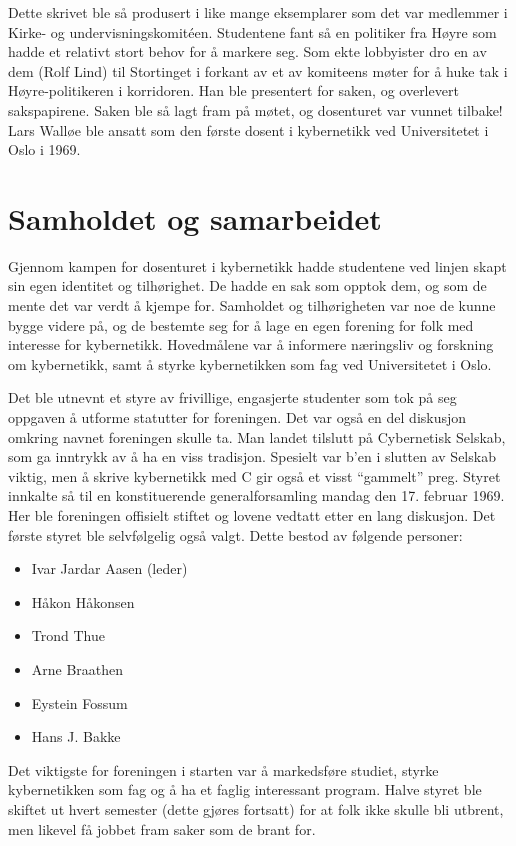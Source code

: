 \documentclass[../../main.tex]{subfiles}
\begin{document}
Dette skrivet ble så produsert i like mange eksemplarer som det var medlemmer i Kirke- og undervisningskomitéen. Studentene fant så en politiker fra Høyre som hadde et relativt stort behov for å markere seg. Som ekte lobbyister dro en av dem (Rolf Lind) til Stortinget i forkant av et av komiteens møter for å huke tak i Høyre-politikeren i korridoren. Han ble presentert for saken, og overlevert sakspapirene. Saken ble så lagt fram på møtet, og dosenturet var vunnet tilbake!
Lars Walløe ble ansatt som den første dosent i kybernetikk ved Universitetet i Oslo i 1969.

\section{Samholdet og samarbeidet}

Gjennom kampen for dosenturet i kybernetikk hadde studentene ved linjen skapt sin egen identitet og tilhørighet. De hadde en sak som opptok dem, og som de mente det var verdt å kjempe for. Samholdet og tilhørigheten var noe de kunne bygge videre på, og de bestemte seg for å lage en egen forening for folk med interesse for kybernetikk. Hovedmålene var å informere næringsliv og forskning om kybernetikk, samt å styrke kybernetikken som fag ved Universitetet i Oslo.

Det ble utnevnt et styre av frivillige, engasjerte studenter som tok på seg oppgaven å utforme statutter for foreningen. Det var også en del diskusjon omkring navnet foreningen skulle ta. Man landet tilslutt på Cybernetisk Selskab, som ga inntrykk av å ha en viss tradisjon. Spesielt var b'en i slutten av Selskab viktig, men å skrive kybernetikk med C gir også et visst ``gammelt'' preg. Styret innkalte så til en konstituerende generalforsamling mandag den 17. februar 1969. Her ble foreningen offisielt stiftet og lovene vedtatt etter en lang diskusjon. Det første styret ble selvfølgelig også valgt. Dette bestod av følgende personer:

\begin{itemize}
\item Ivar Jardar Aasen (leder)
\item Håkon Håkonsen
\item Trond Thue
\item Arne Braathen
\item Eystein Fossum
\item Hans J. Bakke
\end{itemize}

Det viktigste for foreningen i starten var å markedsføre studiet, styrke kybernetikken som fag og å ha et faglig interessant program. Halve styret ble skiftet ut hvert semester (dette gjøres fortsatt) for at folk ikke skulle bli utbrent, men likevel få jobbet fram saker som de brant for.
\end{document}
